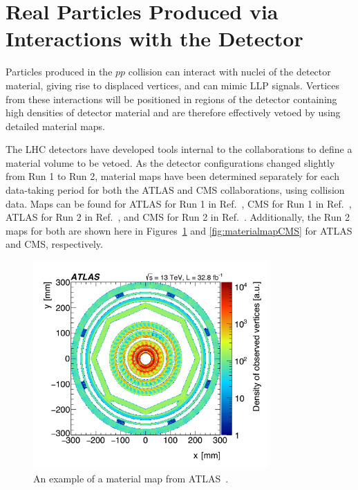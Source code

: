 \section{Real Particles Produced via Interactions with the Detector} %

Particles produced in the $pp$ collision can interact with nuclei of the detector material, giving rise to displaced vertices, and can mimic LLP signals. Vertices from these interactions will be positioned in regions of the detector containing high densities of detector material and are therefore effectively vetoed by using detailed material maps.

The LHC detectors have developed tools internal to the collaborations to define a material volume to be vetoed. As the detector configurations changed slightly from Run 1 to Run 2, material maps have been determined separately for each data-taking period for both the ATLAS and CMS collaborations, using collision data. Maps can be found for ATLAS for Run 1 in Ref.~\cite{Aaboud:2016poq}, CMS for Run 1 in Ref.~\cite{CMS:2010nua}, ATLAS for Run 2 in Ref.~\cite{Aaboud:2017iio}, and CMS for Run 2 in Ref.~\cite{Sirunyan:2018icq}. Additionally, the Run 2 maps for both are shown here in Figures~\ref{fig:materialmapATLAS} and \ref{fig:materialmapCMS} for ATLAS and CMS, respectively.
%
\begin{figure}[t]
  \centering
  \includegraphics[width=0.8\textwidth]{figures/atlasmaterial.png}
  \caption{An example of a material map from ATLAS~\cite{Aaboud:2017iio}.
  }
  \label{fig:materialmapATLAS}
\end{figure}

